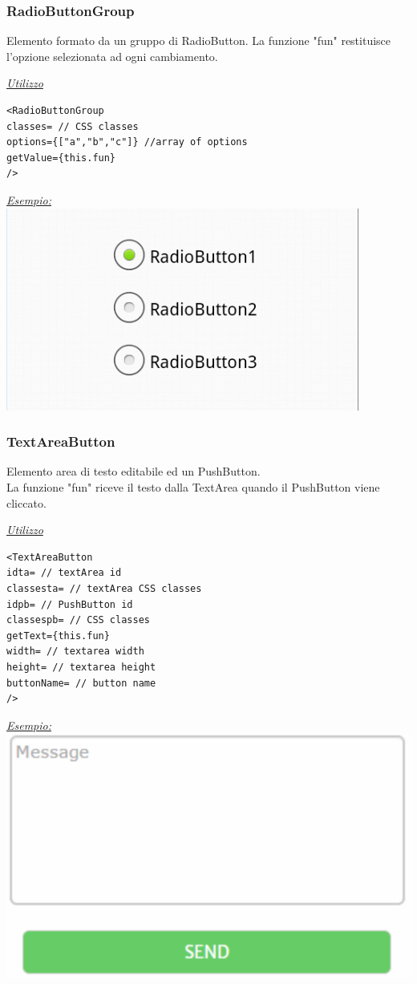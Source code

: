 \subsubsection{RadioButtonGroup}
Elemento formato da un gruppo di RadioButton. La funzione "fun" restituisce l'opzione selezionata ad ogni cambiamento.
\begin{center}
\underline{\textit{Utilizzo}}
\begin{lstlisting}
<RadioButtonGroup
classes= // CSS classes
options={["a","b","c"]} //array of options
getValue={this.fun}
/>
\end{lstlisting}
\underline{\textit{Esempio:}}
\\
\includegraphics[scale=0.6]{img/radiob.png}
\\
\end{center}

\subsubsection{TextAreaButton}
Elemento area di testo editabile ed un PushButton.\\
La funzione "fun" riceve il testo dalla TextArea quando il PushButton viene cliccato.
\begin{center}
\underline{\textit{Utilizzo}}
\begin{lstlisting}
<TextAreaButton
idta= // textArea id
classesta= // textArea CSS classes
idpb= // PushButton id
classespb= // CSS classes
getText={this.fun}
width= // textarea width
height= // textarea height
buttonName= // button name
/>
\end{lstlisting}
\underline{\textit{Esempio:}}
\\
\includegraphics[scale=0.5]{img/textB.png}
\\
\end{center}


